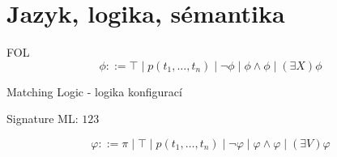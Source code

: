 \documentclass[11pt]{beamer}
\begin{document}
\section{Jazyk, logika, sémantika}


\begin{frame}{FOL}
\begin{equation}
\phi ::= \top \mid p(t_1,\ldots,t_n) \mid \neg \phi \mid \phi \land \phi \mid \left( \exists X \right) \phi
\end{equation}
\end{frame}

\begin{frame}{Matching Logic - logika konfigurací}

Signature ML: $ 123 $

\begin{equation}
\varphi ::= \pi \mid \top \mid p(t_1,\ldots,t_n) \mid \neg \varphi \mid \varphi \land \varphi \mid \left( \exists V \right) \varphi
\end{equation}
\end{frame}
\end{document}
